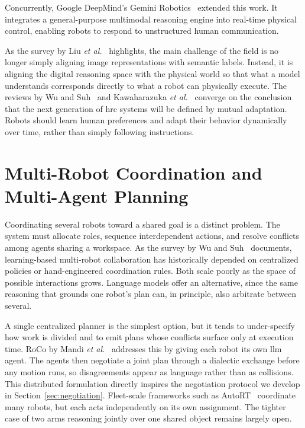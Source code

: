 \documentclass[
     12pt,
     a4paper,
     BCOR=10mm,
     DIV=14,
     listof=totoc,
     bibliography=totoc,
     parskip,
     twoside,
     headsepline
     ]{scrreprt}
\begin{document}
Concurrently, Google DeepMind's Gemini Robotics~\cite{google2026} extended this work. It integrates a general-purpose multimodal reasoning engine into real-time physical control, enabling robots to respond to unstructured human communication.

As the survey by Liu \emph{et al.}~\cite{liu2025aligningcyberspacephysical} highlights, the main challenge of the field is no longer simply aligning image representations with semantic labels. Instead, it is aligning the digital reasoning space with the physical world so that what a model understands corresponds directly to what a robot can physically execute. The reviews by Wu and Suh~\cite{wu2024stateoftheartrobotlearningmultirobot} and Kawaharazuka \emph{et al.}~\cite{Kawaharazuka_2024} converge on the conclusion that the next generation of \gls{hrc} systems will be defined by mutual adaptation. Robots should learn human preferences and adapt their behavior dynamically over time, rather than simply following instructions.

\section{Multi-Robot Coordination and Multi-Agent Planning}
Coordinating several robots toward a shared goal is a distinct problem. The system must allocate roles, sequence interdependent actions, and resolve conflicts among agents sharing a workspace. As the survey by Wu and Suh~\cite{wu2024stateoftheartrobotlearningmultirobot} documents, learning-based multi-robot collaboration has historically depended on centralized policies or hand-engineered coordination rules. Both scale poorly as the space of possible interactions grows. Language models offer an alternative, since the same reasoning that grounds one robot's plan can, in principle, also arbitrate between several.

A single centralized planner is the simplest option, but it tends to under-specify how work is divided and to emit plans whose conflicts surface only at execution time. RoCo by Mandi \emph{et al.}~\cite{mandi2023rocodialecticmultirobotcollaboration} addresses this by giving each robot its own \gls{llm} agent. The agents then negotiate a joint plan through a dialectic exchange before any motion runs, so disagreements appear as language rather than as collisions. This distributed formulation directly inspires the negotiation protocol we develop in Section~\ref{sec:negotiation}. Fleet-scale frameworks such as AutoRT~\cite{ahn2024autortembodiedfoundationmodels} coordinate many robots, but each acts independently on its own assignment. The tighter case of two arms reasoning jointly over one shared object remains largely open.
\end{document}
